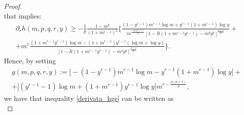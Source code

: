 \documentclass[10pt,a4paper]{amsart}
\newcommand{\de}{\partial}
\begin{document}
\begin{proof}
\begin{equation*}
\end{equation*}
that implies:
\begin{multline}\label{derivata_hge}
\de_{r}h(m,p,q,r,y) \ge -\frac1p\frac{1-m^{q}}{(1+m^{r-1})^{2}}\bigg\{\frac{ (1-y^{r-1})m^{r-1}\log m +y^{r-1}(1+m^{r-1})\log y}{m^{\frac {-q(p+1)}p}  \left[1-R(1+m^{r-1}y^{r-1})-m^{q}y^{q}\right]^\frac {p+1} p }+ \\[.3cm]
+m^r \frac{(1+m^{r-1}y^{r-1})\log m-(1+m^{r-1})y^{r-1}(\log m +\log y)}{ \left[1-R(1+m^{r-1}y^{r-1})-m^{q}y^{q}\right]^\frac {p+1} p}\bigg\}.
\end{multline}
Hence, by setting
\begin{multline*}
g(m,p,q,r,y):=\bigg[ -(1-y^{r-1})m^{r-1}\log m -y^{r-1}(1+m^{r-1})\log y\bigg]+\\
+ \bigg[(y^{r-1}-1)\log m+(1+m^{r-1})y^{r-1}\log y\bigg]m^{r-\frac{q(p+1)}p},
\end{multline*}
we have that inequality \eqref{derivata_hge} can be written as
\begin{equation}\label{derivative_h}

\end{equation}
\end{proof}
\end{document}
